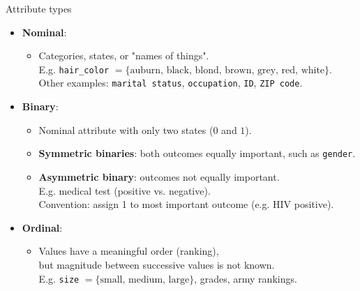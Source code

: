 \documentclass[aspectratio=169,t]{beamer}
\begin{document}
  { 
    \begin{frame}{Attribute types}
    \begin{itemize}
        \item \textbf{Nominal}:
        \begin{itemize}
            \item Categories, states, or "names of things".\\
                  E.g. \texttt{hair\_color} $= \{\text{auburn, black, blond, brown, grey, red, white}\}$.\\
                  Other examples: \texttt{marital status}, \texttt{occupation}, \texttt{ID}, \texttt{ZIP code}.
        \end{itemize}
        \item \textbf{Binary}:
            \begin{itemize}
                \item Nominal attribute with only two states ($0$ and $1$).
                \item \textbf{Symmetric binaries}: both outcomes equally important, such as \texttt{gender}.
                \item \textbf{Asymmetric binary}: outcomes not equally important. \\
                      E.g. medical test (positive vs. negative).\\
                      Convention: assign 1 to most important outcome (e.g. HIV positive).
            \end{itemize}
        \item \textbf{Ordinal}:
        \begin{itemize}
            \item Values have a meaningful order (ranking),\\
            but magnitude between successive values is not known.\\
            E.g. \texttt{size} $= \{\text{small, medium, large}\}$, grades, army rankings.
        \end{itemize}
        \end{itemize}
    \end{frame}
  }
\end{document}
